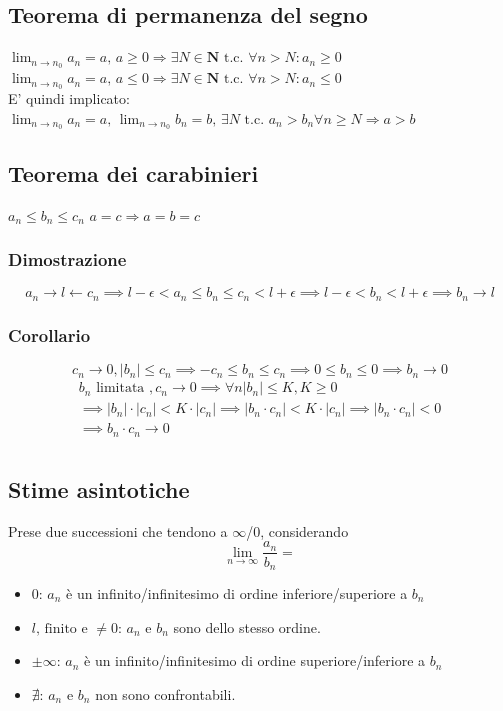 \documentclass{report}
\begin{document}
    \subsection{Teorema di permanenza del segno}
        $\lim_{n \to n_0} a_n = a, \, a \geq 0 \Longrightarrow \exists N \in \mathbf{N} \textrm{ t.c. }
            \forall n > N: a_n \geq 0$ \\
        $\lim_{n \to n_0} a_n = a, \, a \leq 0 \Longrightarrow \exists N \in \mathbf{N} \textrm{ t.c. }
            \forall n > N: a_n \leq 0$ \\
        E' quindi implicato: \\
        $\lim_{n \to n_0} a_n = a, \, \lim_{n \to n_0} b_n = b, \, \exists N \textrm{ t.c. } a_n > b_n \forall n \geq N \Longrightarrow a > b$
    \subsection{Teorema dei carabinieri}
        $a_n \leq b_n \leq c_n$
        $a = c \Longrightarrow a = b = c$
        \subsubsection{Dimostrazione}
            $$a_n \rightarrow l \leftarrow c_n \implies l - \epsilon < a_n \leq b_n \leq c_n < l + \epsilon 
                \implies l - \epsilon < b_n < l + \epsilon \implies b_n \rightarrow l$$
        \subsubsection{Corollario}
            $$c_n \rightarrow 0, |b_n| \leq c_n \implies -c_n \leq b_n \leq c_n \implies 0 \leq b_n \leq 0 \implies b_n \rightarrow 0$$
            $$\begin{array}{c}
                b_n \textrm{ limitata }, c_n \rightarrow 0 \implies \forall n |b_n| \leq K, K \geq 0 \\
                \implies |b_n| \cdot |c_n| < K \cdot |c_n| \implies |b_n \cdot c_n| < K \cdot |c_n| \implies |b_n \cdot c_n| < 0 \\
                \implies b_n \cdot c_n \rightarrow 0 \\
            \end{array}$$
    \subsection{Stime asintotiche}
        Prese due successioni che tendono a $\infty$/$0$, considerando 
        $$\lim_{n \to \infty}\frac{a_n}{b_n} = $$
    \begin{itemize}
        \item $0$: $a_n$ è un infinito/infinitesimo di ordine inferiore/superiore a $b_n$
        \item $l, \, \textrm{finito e } \neq 0$: $a_n$ e $b_n$ sono dello stesso ordine. \\
        \item $\pm \infty$: $a_n$ è un infinito/infinitesimo di ordine superiore/inferiore a $b_n$
        \item $\nexists$: $a_n$ e $b_n$ non sono confrontabili.
    \end{itemize}
\end{document}

